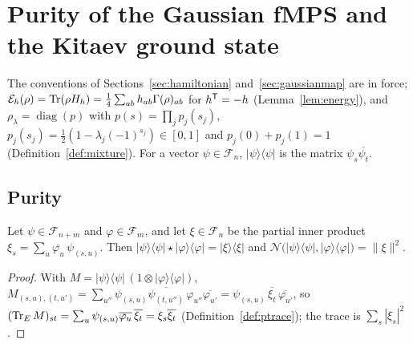 \section{Purity of the Gaussian fMPS and the Kitaev ground state}
\label{sec:fmps}

The conventions of Sections~\ref{sec:hamiltonian} and~\ref{sec:gaussianmap} are in force;
$\mathcal E_h(\rho)=\operatorname{Tr}(\rho H_h)=\tfrac14\sum_{ab}h_{ab}\Gamma(\rho)_{ab}$ for $h^{\mathsf T}=-h$
(Lemma~\ref{lem:energy}), and $\rho_\lambda=\operatorname{diag}(p)$ with $p(s)=\prod_jp_j(s_j)$,
$p_j(s_j)=\tfrac12(1-\lambda_j(-1)^{s_j})\in[0,1]$ and $p_j(0)+p_j(1)=1$
(Definition~\ref{def:mixture}). For a vector $\psi\in\mathcal F_n$, $|\psi\rangle\langle\psi|$ is
the matrix $\psi_s\overline{\psi_t}$.

\subsection{Purity}
\label{sec:purity}

\begin{lemma}\label{lem:rank-one}
Let $\psi\in\mathcal F_{n+m}$ and $\varphi\in\mathcal F_m$, and let $\xi\in\mathcal F_n$ be the
partial inner product $\xi_s=\sum_u\overline{\varphi_u}\,\psi_{(s,u)}$. Then
$|\psi\rangle\langle\psi|\star|\varphi\rangle\langle\varphi|=|\xi\rangle\langle\xi|$ and
$\mathcal N\bigl(|\psi\rangle\langle\psi|,|\varphi\rangle\langle\varphi|\bigr)=\|\xi\|^2$.
\end{lemma}
\begin{proof}
With $M=|\psi\rangle\langle\psi|\,(1\otimes|\varphi\rangle\langle\varphi|)$,
$M_{(s,u),(t,u')}=\sum_{u''}\psi_{(s,u)}\overline{\psi_{(t,u'')}}\,\varphi_{u''}\overline{\varphi_{u'}}
=\psi_{(s,u)}\,\overline{\xi_t}\,\overline{\varphi_{u'}}$, so
$(\operatorname{Tr}_{E}M)_{st}=\sum_u\psi_{(s,u)}\overline{\varphi_u}\,\overline{\xi_t}=\xi_s\overline{\xi_t}$
(Definition~\ref{def:ptrace}); the trace is $\sum_s|\xi_s|^2$.
\end{proof}

